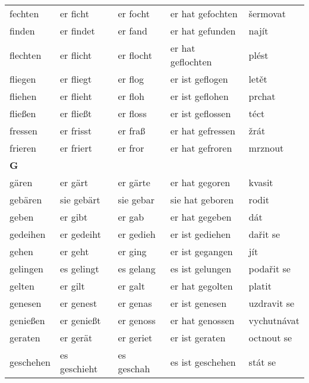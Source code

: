 \documentclass[a4paper,12pt]{report}
\begin{document}
\begin{longtable}{ | m{2cm} | m{2.5cm} | m{2.5cm} | m{4cm} | m{3cm} | }
    fechten     & er ficht      & er focht     & er hat gefochten   & šermovat           \\
    finden      & er findet     & er fand      & er hat gefunden    & najít              \\
    flechten    & er flicht     & er flocht    & er hat geflochten  & plést              \\
    fliegen     & er fliegt     & er flog      & er ist geflogen    & letět              \\
    fliehen     & er flieht     & er floh      & er ist geflohen    & prchat             \\
    fließen     & er fließt     & er floss     & er ist geflossen   & téct               \\
    fressen     & er frisst     & er fraß      & er hat gefressen   & žrát               \\
    frieren     & er friert     & er fror      & er hat gefroren    & mrznout            \\
    \hline
    \newpage
    \hline
    \textbf{G}  &               &              &                    &                    \\
    gären       & er gärt       & er gärte     & er hat gegoren     & kvasit             \\
    gebären     & sie gebärt    & sie gebar    & sie hat geboren    & rodit              \\
    geben       & er gibt       & er gab       & er hat gegeben     & dát                \\
    gedeihen    & er gedeiht    & er gedieh    & er ist gediehen    & dařit se           \\
    gehen       & er geht       & er ging      & er ist gegangen    & jít                \\
    gelingen    & es gelingt    & es gelang    & es ist gelungen    & podařit se         \\
    gelten      & er gilt       & er galt      & er hat gegolten    & platit             \\
    genesen     & er genest     & er genas     & er ist genesen     & uzdravit se        \\
    genießen    & er genießt    & er genoss    & er hat genossen    & vychutnávat        \\
    geraten     & er gerät      & er geriet    & er ist geraten     & octnout se         \\
    geschehen   & es geschieht  & es geschah   & es ist geschehen   & stát se            \\

\end{longtable}
\end{document}

